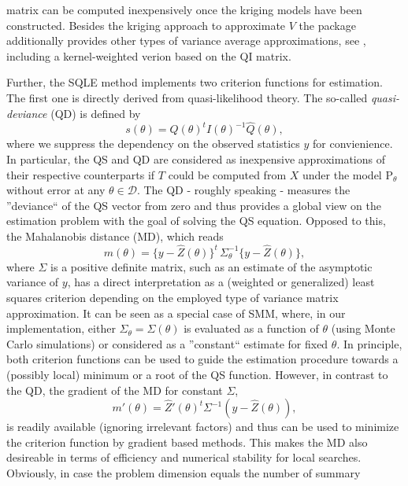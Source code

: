 \documentclass[article, nojss]{jss}
\numberwithin{equation}{section}			%
\newcommand{\D}{\mathcal{D}}
\newcommand{\Ptheta}{\mathrm{P}_{\theta}}
\begin{document}
matrix can be computed inexpensively once the kriging models have been constructed. Besides
the kriging approach to approximate $V$ the package additionally provides other
types of variance average approximations, see \citet{Dryden2009}, including a
kernel-weighted verion based on the QI matrix.\par
%
Further, the SQLE method implements two criterion functions for estimation. The
first one is directly derived from quasi-likelihood theory. The so-called
\emph{quasi-deviance} (QD) is defined by
\begin{equation}\label{approxQD} 
  s(\theta) = \hat{Q}(\theta)^t \hat{I}(\theta)^{-1} \hat{Q}(\theta),
\end{equation} 
where we suppress the dependency on the observed statistics $y$ for
convienience. In particular, the QS and QD are considered as inexpensive approximations
of their respective counterparts if $T$ could be computed from $X$ under the
model $\Ptheta$ without error at any $\theta\in\D$. The QD - roughly speaking - measures the
''deviance`` of the QS vector from zero and thus provides a global view on the estimation
problem with the goal of solving the QS equation. Opposed to this, the
Mahalanobis distance (MD), which reads
\begin{equation}
  m(\theta)=\{y-\hat{Z}(\theta)\}^t\,\Sigma_{\theta}^{-1}\{y-\hat{Z}(\theta)\},
\end{equation}
where $\Sigma$ is a positive definite matrix, such as an estimate of the
asymptotic variance of $y$, has a direct interpretation as a (weighted or
generalized) least squares criterion depending on the employed type of variance
matrix approximation. It can be seen as a special case of SMM, where, in our
implementation, either $\Sigma_{\theta}=\Sigma(\theta)$ is evaluated as a function of $\theta$
(using Monte Carlo simulations) or considered as a ''constant`` estimate for
fixed $\theta$. In principle, both criterion functions can be used to guide the estimation procedure
towards a (possibly local) minimum or a root of the QS function. However, in
contrast to the QD, the gradient of the MD for constant $\Sigma$,
\begin{equation}
  m'(\theta)=\hat{Z}'(\theta)^t \Sigma^{-1}(y-\hat{Z}(\theta)),
\end{equation}
is readily available (ignoring irrelevant factors) and thus can be
used to minimize the criterion function by gradient based methods. This makes
the MD also desireable in terms of efficiency and numerical stability for local
searches. Obviously, in case the problem dimension equals the number of summary
\end{document}
